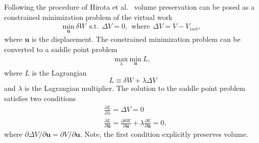 Following the procedure of Hirota et al.\ \cite{Hirota:2000jw} volume preservation can be posed as a constrained minimization problem of the virtual work
%
\begin{equation}
\begin{aligned}
\underset{ \pmb{u}}{\text{min}} \ \delta W \ \ \text{s.t.} \ \ \Delta V = 0, \ \ \text{where} \ \ \Delta V = V - V_{init},\
\end{aligned}
\end{equation}
%
where $\pmb{u}$ is the displacement. The constrained minimization problem can be converted to a saddle point problem
%
\begin{equation}
\begin{aligned}
\underset{\lambda}{\text{max}} \ \underset{\pmb{u}}{\text{min}} \ L,
\end{aligned}
\label{eq:saddlept}
\end{equation}
%
where $L$ is the Lagrangian
%
\begin{equation}
L \equiv \delta W + \lambda \Delta V
\label{eq:Lagrangian}
\end{equation}
%
and $\lambda$ is the Lagrangian multiplier. The solution to the saddle point problem satisfies two conditions
%
\begin{equation}
\begin{aligned}
&\frac{\partial L}{\partial \lambda} = \Delta V = 0 \\
&\frac{\partial L}{\partial \pmb{u}} = \frac{\partial \delta W}{\partial \pmb{u}} + \lambda \frac{\partial V}{\partial \pmb{u}} = 0,
\end{aligned}
\label{eq:conditions}
\end{equation}
%
where $\partial \Delta V/\partial \pmb{u} = \partial V/\partial \pmb{u}$. Note, the first condition explicitly preserves volume. 

